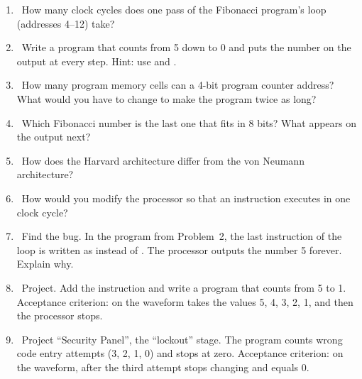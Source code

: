 \begin{taskbox}
\begin{enumerate}
  \item {}~How many clock cycles does one pass of the Fibonacci program's loop
        (addresses 4--12) take?
  \item {}~Write a program that counts from 5 down to 0 and puts the number on
        the output at every step. Hint: use  and .
  \item {}~How many program memory cells can a 4-bit program counter address?
        What would you have to change to make the program twice as long?
  \item {}~Which Fibonacci number is the last one that fits in 8 bits?
        What appears on the output next?
  \item {}~How does the Harvard architecture differ from the von Neumann architecture?
  \item {}~How would you modify the processor so that an instruction executes in one clock cycle?
  \item {}~Find the bug. In the program from Problem~2, the last instruction of the loop is written as
         instead of . The processor outputs the number 5 forever. Explain why.
  \item {}~Project. Add the  instruction and write a program that counts from 5 to 1.
        Acceptance criterion: on the waveform  takes the values 5, 4, 3, 2, 1, and then the processor stops.
  \item {}~Project ``Security Panel'', the ``lockout'' stage. The program counts wrong code
        entry attempts (3, 2, 1, 0) and stops at zero. Acceptance criterion: on the waveform, after the third
        attempt  stops changing and  equals 0.
\end{enumerate}
\end{taskbox}
